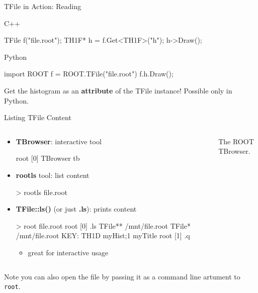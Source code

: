 \documentclass[aspectratio=169]{beamer}
\newcommand{\myfigure}[2]{
    \begin{figure}
        \makebox[\textwidth]{%
            \texttt{[image: \#2]}
        }
    \end{figure}
}
\begin{document}
\begin{frame}[fragile]{TFile in Action: Reading}
        \begin{block}{C++}
            \begin{myterminal}
TFile f("file.root");
TH1F* h = f.Get<TH1F>("h");
h->Draw();
            \end{myterminal}
        \end{block}
        \begin{block}{Python}
            \begin{myterminal}
import ROOT
f = ROOT.TFile("file.root")
f.h.Draw();
            \end{myterminal}
        \end{block}
        Get the histogram as an \textbf{attribute} of the TFile instance! Possible only in Python.
\end{frame}

\begin{frame}[fragile]{Listing TFile Content}
\begin{columns}
    \begin{column}{0.43\textwidth}
    \begin{itemize}
    \item \textbf{TBrowser}: interactive tool
    \begin{myterminal}
root [0] TBrowser tb
    \end{myterminal}
    \item \textbf{rootls} tool: list content
    \begin{myterminal}
> rootls file.root
    \end{myterminal}
    \item \textbf{TFile::ls()} (or just \textbf{.ls}): prints content
    \begin{myterminaltiny}
> root file.root
root [0] .ls
TFile**		/mnt/file.root
 TFile*		/mnt/file.root
  KEY: TH1D	myHist;1	myTitle
root [1] .q
    \end{myterminaltiny}
    \begin{itemize}
        \item great for interactive usage
    \end{itemize}
    \end{itemize}
    \end{column}
    \begin{column}{0.57\textwidth}
    \myfigure{1.1}{tbrowser.png}
    \begin{center}
        {\small The ROOT TBrowser.}
    \end{center}
    \end{column}
\end{columns}
\vspace{2mm}
Note you can also open the file by passing it as a command line artument to \texttt{root}.
\end{frame}
\end{document}
